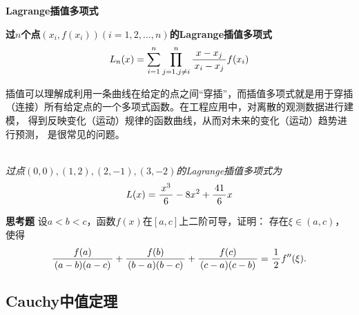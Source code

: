 \begin{shaded}
	{\bf Lagrange插值多项式}

	\begin{tcolorbox}
		{\bf 过$n$个点$(x_i,f(x_i))(i=1,2,\ldots,n)$的Lagrange插值多项式}
		$$L_n(x)=\sum\limits_{i=1}^n\prod_{j=1,j\ne i}^{n}
		\displaystyle\frac{\,{x-x_j}\,}{\,{x_i-x_j}\,}f(x_i)$$
	\end{tcolorbox}
	
	插值可以理解成利用一条曲线在给定的点之间“穿插”，而插值多项式就是用于穿插
	（连接）所有给定点的一个多项式函数。在工程应用中，对离散的观测数据进行建模，
	得到反映变化（运动）规律的函数曲线，从而对未来的变化（运动）趋势进行预测，
	是很常见的问题。
	
	\begin{center}
		\\
		\it 过点$(0,0),(1,2),(2,-1),(3,-2)$的Lagrange插值多项式为
		$$L(x)=\displaystyle\frac{\,{x^3}\,}{\,{6}\,}-8x^2+\displaystyle\frac{\,{41}\,}{\,{6}\,}x$$
	\end{center}

	{\bf 思考题} 设$a<b<c$，函数$f(x)$在$[a,c]$上二阶可导，证明：
	存在$\xi\in(a,c)$，使得
	$$
	\displaystyle\frac{\,{f(a)}\,}{\,{(a-b)(a-c)}\,}+\displaystyle\frac{\,{f(b)}\,}{\,{(b-a)(b-c)}\,}
	+\displaystyle\frac{\,{f(c)}\,}{\,{(c-a)(c-b)}\,}=\displaystyle\frac{\,{1}\,}{\,{2}\,}f''(\xi).
	$$
\end{shaded}



% 

\subsection{Cauchy中值定理}

